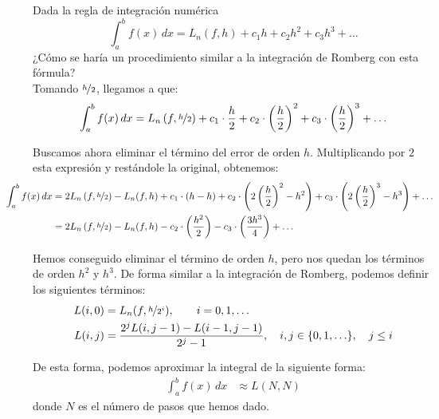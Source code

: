 \begin{ejercicio}
    Dada la regla de integración numérica
    \begin{equation*}
        \int_a^b f(x) \, dx = L_n(f, h) + c_1 h + c_2 h^2 + c_3 h^3 + \ldots
    \end{equation*}
    ¿Cómo se haría un procedimiento similar a la integración de Romberg con esta fórmula?\\


    Tomando $\nicefrac{h}{2}$, llegamos a que:
    \begin{align*}
        \int_a^b f(x) \, dx &= L_n\left(f,\nicefrac{h}{2}\right) + c_1 \cdot \frac{h}{2} + c_2 \cdot \left(\frac{h}{2}\right)^2 + c_3 \cdot \left(\frac{h}{2}\right)^3 + \ldots\\
    \end{align*}

    Buscamos ahora eliminar el término del error de orden $h$. Multiplicando por $2$ esta expresión y restándole la original, obtenemos:
    \begin{align*}
        \hspace{-1cm}\int_a^b f(x) \, dx &= 2L_n\left(f,\nicefrac{h}{2}\right) - L_n(f, h) + c_1 \cdot \left(h-h\right) + c_2 \cdot \left(2\left(\frac{h}{2}\right)^2 - h^2\right) + c_3 \cdot \left(2\left(\frac{h}{2}\right)^3 - h^3\right) + \ldots\\
        \hspace{-1cm}&= 2L_n\left(f,\nicefrac{h}{2}\right) - L_n(f, h) - c_2 \cdot \left(\frac{h^2}{2}\right) - c_3 \cdot \left(\frac{3h^3}{4}\right) + \ldots
    \end{align*}

    Hemos conseguido eliminar el término de orden $h$, pero nos quedan los términos de orden $h^2$ y $h^3$. De forma similar a la integración de Romberg, podemos definir los siguientes términos:
    \begin{align*}
        L(i,0) &= L_n(f, \nicefrac{h}{2^i}),\qquad i=0,1,\ldots\\
        L(i,j) &= \dfrac{2^jL(i,j-1)-L(i-1,j-1)}{2^j-1}, \quad i,j\in \{0,1,\ldots\}, \quad j\leq i\\
    \end{align*}

    De esta forma, podemos aproximar la integral de la siguiente forma:
    \begin{align*}
        \int_a^b f(x) \, dx &\approx L(N,N)
    \end{align*}
    donde $N$ es el número de pasos que hemos dado.
\end{ejercicio}
